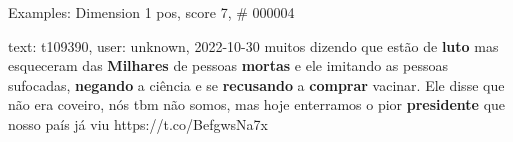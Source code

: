 \begin{frame}{Examples: Dimension 1 pos, score 7, \# 000004}
\footnotesize
\begin{exampleblock}{text: t109390, user: unknown, 2022-10-30}
muitos dizendo que estão de \textbf{luto} mas esqueceram das \textbf{Milhares} 
de pessoas \textbf{mortas} e ele imitando as pessoas sufocadas, 
\textbf{negando} a ciência e se \textbf{recusando} a \textbf{comprar} vacinar. 
Ele disse que não era coveiro, nós tbm não somos, mas hoje enterramos o pior 
\textbf{presidente} que nosso país já viu https://t.co/BefgwsNa7x 
\end{exampleblock}
\end{frame}
